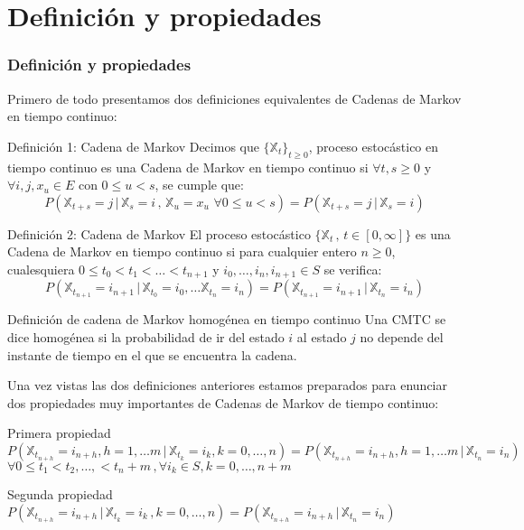 \documentclass{beamer}
\begin{document}
\section{Definición y propiedades}
\begin{frame}
    \frametitle{Definición y propiedades}
    Primero de todo presentamos dos definiciones equivalentes de Cadenas de Markov en tiempo continuo:
    \newline
    \begin{block}{Definición 1: Cadena de Markov}
Decimos que $\{\mathbb{X}_t\}_{t\geq 0}$, proceso estocástico en tiempo continuo es una Cadena de Markov en tiempo continuo si $\forall t,s\geq 0$ y $\forall i,j,x_u\in E$ con $0\leq u <s$, se cumple que:
$$P(\mathbb{X}_{t+s}=j \, | \, \mathbb{X}_s =i \, , \,  \mathbb{X}_u =  x_{u} \,\, \forall 0\leq u< s)=P(\mathbb{X}_{t+s}=j \, | \, \mathbb{X}_s = i)$$
    \end{block}

\end{frame}
\begin{frame}
    \begin{block}{Definición 2: Cadena de Markov}
    El proceso estocástico $\{\mathbb{X}_t \, , \, t\in [0,\infty]\}$ es una Cadena de Markov en tiempo continuo si para cualquier entero $n\geq 0$, cualesquiera $0\leq t_0 < t_1 < \ldots < t_{n+1}$ y $i_0,\ldots , i_n,i_{n+1}\in S$ se verifica:
$$P(\mathbb{X}_{t_{n+1}}=i_{n+1}\, | \, \mathbb{X}_{t_0}=i_0 , \ldots \mathbb{X}_{t_n}=i_n)=P(\mathbb{X}_{t_{n+1}}=i_{n+1}\, | \, \mathbb{X}_{t_n}=i_n)$$
    \end{block}
\end{frame}
\begin{frame}
\begin{block}{Definición de cadena de Markov homogénea en tiempo continuo}
Una CMTC se dice homogénea si la probabilidad de ir del estado $i$ al estado $j$ no depende del instante de tiempo en el que se encuentra la cadena.
\end{block}
\end{frame}
\begin{frame}
Una vez vistas las dos definiciones anteriores estamos preparados para enunciar dos propiedades muy importantes de Cadenas de Markov de tiempo continuo:
\begin{block}{Primera propiedad}
$P(\mathbb{X}_{t_{n+h}}=i_{n+h}, h=1,\ldots m \, | \, \mathbb{X}_{t_k}=i_k, k=0,\ldots ,n)=P(\mathbb{X}_{t_{n+h}}=i_{n+h}, h=1,\ldots m\, |\, \mathbb{X}_{t_n}=i_n )$
\newline\newline
$\forall 0 \leq t_1< t_2, \ldots , < t_n+m\, , \forall i_k\in S, k=0,\ldots , n+m$
\end{block}
\begin{block}{Segunda propiedad}
$P(\mathbb{X}_{t_{n+h}}=i_{n+h}\, | \, \mathbb{X}_{t_k}=i_k \, ,  k=0,\ldots , n)=P(\mathbb{X}_{t_{n+h}}=i_{n+h}\, | \, \mathbb{X}_{t_n}=i_n)$
\end{block}
\end{frame}
\end{document}
